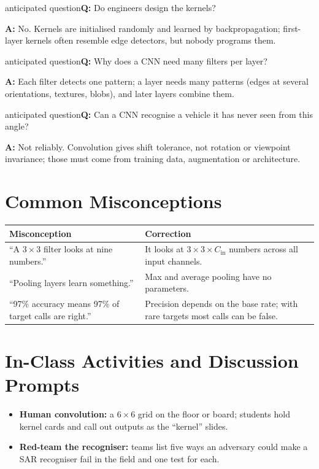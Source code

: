 \documentclass[11pt]{article}
\begin{document}
\begin{question}{anticipated question}\textbf{Q:} Do engineers design the kernels?\par\smallskip\textbf{A:} No. Kernels are initialised randomly and learned by backpropagation; first-layer kernels often resemble edge detectors, but nobody programs them.\end{question}

\begin{question}{anticipated question}\textbf{Q:} Why does a CNN need many filters per layer?\par\smallskip\textbf{A:} Each filter detects one pattern; a layer needs many patterns (edges at several orientations, textures, blobs), and later layers combine them.\end{question}

\begin{question}{anticipated question}\textbf{Q:} Can a CNN recognise a vehicle it has never seen from this angle?\par\smallskip\textbf{A:} Not reliably. Convolution gives shift tolerance, not rotation or viewpoint invariance; those must come from training data, augmentation or architecture.\end{question}

\section{Common Misconceptions}\begin{center}\small\renewcommand{\arraystretch}{1.35}\begin{tabularx}{\textwidth}{@{}>{\raggedright\arraybackslash}X >{\raggedright\arraybackslash}X@{}}\toprule\textbf{Misconception} & \textbf{Correction}\\\midrule``A $3\times3$ filter looks at nine numbers.'' & It looks at $3\times3\times C_{\text{in}}$ numbers across all input channels.\\
``Pooling layers learn something.'' & Max and average pooling have no parameters.\\
``97\% accuracy means 97\% of target calls are right.'' & Precision depends on the base rate; with rare targets most calls can be false.\\\bottomrule\end{tabularx}\end{center}

\section{In-Class Activities and Discussion Prompts}\label{sec:act}\begin{itemize}\item \textbf{Human convolution:} a $6\times6$ grid on the floor or board; students hold kernel cards and call out outputs as the ``kernel'' slides.\item \textbf{Red-team the recogniser:} teams list five ways an adversary could make a SAR recogniser fail in the field and one test for each.\end{itemize}
\end{document}
